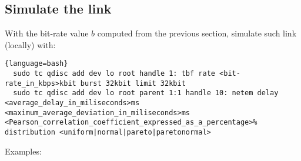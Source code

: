 \subsection{Simulate the link}
With the bit-rate value $b$ computed from the previous section, simulate
such link (locally) with:

\begin{lstlisting}{language=bash}
  sudo tc qdisc add dev lo root handle 1: tbf rate <bit-rate_in_kbps>kbit burst 32kbit limit 32kbit
  sudo tc qdisc add dev lo root parent 1:1 handle 10: netem delay <average_delay_in_miliseconds>ms <maximum_average_deviation_in_miliseconds>ms <Pearson_correlation_coefficient_expressed_as_a_percentage>% distribution <uniform|normal|pareto|paretonormal>
\end{lstlisting}

Examples:

